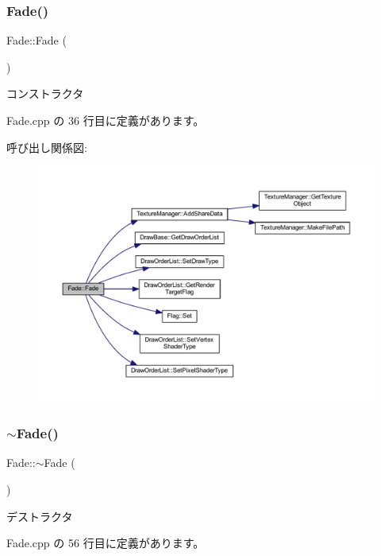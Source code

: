 \subsubsection{\texorpdfstring{Fade()}{Fade()}}
{\footnotesize\ttfamily Fade\+::\+Fade (\begin{DoxyParamCaption}{ }\end{DoxyParamCaption})}



コンストラクタ 



 Fade.\+cpp の 36 行目に定義があります。

呼び出し関係図\+:\nopagebreak
\begin{figure}[H]
\begin{center}
\leavevmode
\includegraphics[width=350pt]{class_fade_aec1ac5a0a80be8d7a2a43dbde2a741ee_cgraph}
\end{center}
\end{figure}
\mbox{\label{class_fade_a58ddf7585cb85bf84f5e83adbe2734f9}} 
\subsubsection{\texorpdfstring{$\sim$\+Fade()}{~Fade()}}
{\footnotesize\ttfamily Fade\+::$\sim$\+Fade (\begin{DoxyParamCaption}{ }\end{DoxyParamCaption})}



デストラクタ 



 Fade.\+cpp の 56 行目に定義があります。

